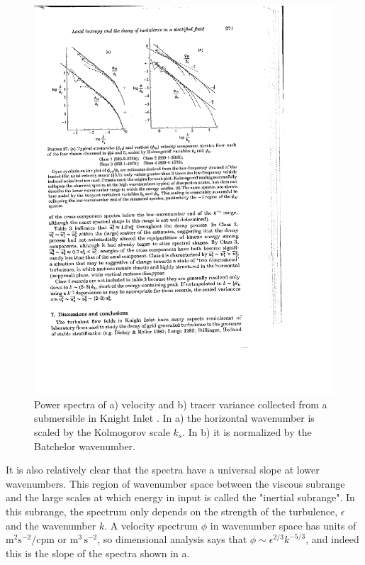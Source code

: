 \documentclass[11pt]{article}
\begin{document}
\begin{figure}[hbtp]
  \begin{center}\includegraphics[width=4.5in]{images/GargettEtal84Fig27}     
  \caption{Power spectra of  a) velocity and b) tracer variance collected from a submersible in Knight Inlet \citep{gargettetal84}.  In a) the horizontal wavenumber is scaled by the Kolmogorov scale $k_s$.  In b) it is normalized by the Batchelor wavenumber.}
    \label{fig:GargettEtal84Fig27}
  \end{center}
\end{figure}

It is also relatively clear that the spectra have a universal slope at lower wavenumbers.  This region of wavenumber space between the viscous subrange and the large scales at which energy in input is called the "inertial subrange".  In this subrange, the spectrum only depends on the strength of the turbulence, $\epsilon$ and the wavenumber $k$.  A velocity spectrum $\phi$ in wavenumber space has units of $\mathrm{m^2s^{-2} / cpm}$ or $\mathrm{m^3\,s^{-2}}$, so dimensional analysis says that $\phi \sim \epsilon^{2/3}k^{-5/3}$, and indeed this is the slope of the spectra shown in a.  
\end{document}
